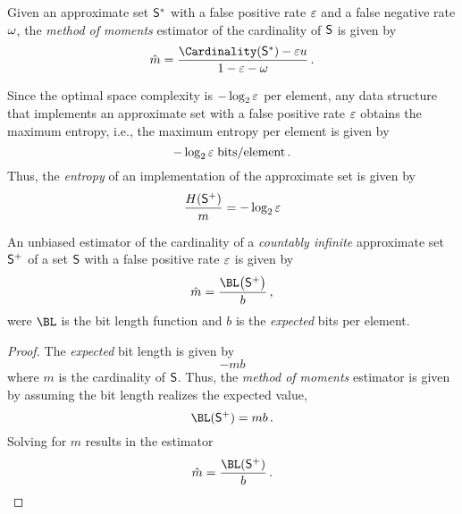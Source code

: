 \documentclass[ ../main.tex]{subfiles}
\begin{document}
Given an approximate set $\ASet{S}$ with a false positive rate $\fprate$ and a false negative rate $\fnrate$, the \emph{method of moments} estimator of the cardinality of $\Set{S}$ is given by
\begin{equation}
\label{eq:exp_St_finite}
    \hat{m} = \frac{\Cardinality\!\left(\ASet{S}\right) - \fprate u}{1 - \fprate - \fnrate}\,.
\end{equation}


Since the optimal space complexity is $-\log_2 \fprate$ per element, any data structure that implements an approximate set with a false positive rate $\fprate$ obtains the maximum entropy, i.e., the maximum entropy per element is given by
\begin{equation}
    -\log_2 \fprate \; \si{bits \per element}\,.
\end{equation}
Thus, the \emph{entropy} of an implementation of the approximate set is given by
\begin{equation}
    \frac{H(\PASet{S})}{m} = -\log_2 \fprate
\end{equation}




\begin{theorem}
An unbiased estimator of the cardinality of a \emph{countably infinite} approximate set $\PASet{S}$ of a set $\Set{S}$ with a false positive rate $\fprate$ is given by
\begin{equation}
    \hat{m} = \frac{\BL\!\left(\PASet{S}\right)}{b}\,,
\end{equation}
were $\BL$ is the bit length function and $b$ is the \emph{expected} bits per element.
\end{theorem}
\begin{proof}
The \emph{expected} bit length is given by
\begin{equation*}
    -m b
\end{equation*}
where $m$ is the cardinality of $\Set{S}$. Thus, the \emph{method of moments} estimator is given by assuming the bit length realizes the expected value,
\begin{equation}
    \BL(\PASet{S}) = m b\,.
\end{equation}
Solving for $m$ results in the estimator
\begin{equation}
    \hat{m} = \frac{\BL(\PASet{S})}{b}\,.
\end{equation}
\end{proof}
\end{document}
